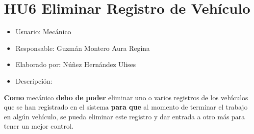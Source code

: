 \section{HU6 Eliminar Registro de Vehículo}
\begin{itemize}
	\item Usuario: Mecánico
	\item Responsable: Guzmán Montero Aura Regina
	\item Elaborado por: Núñez Hernández Ulises
	\item Descripción:\\
\end{itemize}

\textbf{Como} mecánico \textbf{debo de poder} eliminar uno o varios registros de los vehículos que se han registrado en el sistema \textbf{para que} al momento de terminar el trabajo en algún vehículo, se pueda eliminar este registro y dar entrada a otro más para tener un mejor control. 